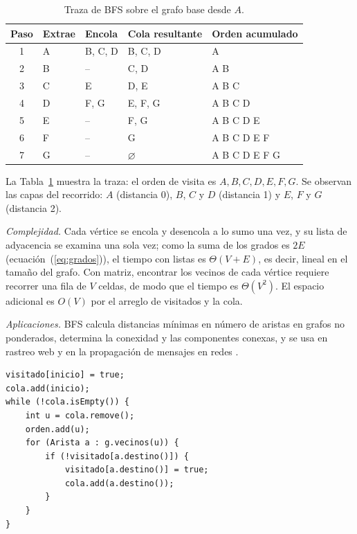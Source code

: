 \documentclass[conference]{IEEEtran}
\begin{document}
\begin{table}[t]
\caption{Traza de BFS sobre el grafo base desde $A$.}
\label{tab:bfs}
\centering
\footnotesize
\setlength{\tabcolsep}{4pt}
\begin{tabular}{@{}clllp{2.4cm}@{}}
\toprule
Paso & Extrae & Encola & Cola resultante & Orden acumulado \\
\midrule
1 & A & B, C, D & B, C, D & A \\
2 & B & -- & C, D & A B \\
3 & C & E & D, E & A B C \\
4 & D & F, G & E, F, G & A B C D \\
5 & E & -- & F, G & A B C D E \\
6 & F & -- & G & A B C D E F \\
7 & G & -- & $\varnothing$ & A B C D E F G \\
\bottomrule
\end{tabular}
\end{table}

La Tabla~\ref{tab:bfs} muestra la traza: el orden de visita es $A,B,C,D,E,F,G$. Se observan las capas del recorrido: $A$ (distancia 0), $B$, $C$ y $D$ (distancia 1) y $E$, $F$ y $G$ (distancia 2).

\emph{Complejidad.} Cada vértice se encola y desencola a lo sumo una vez, y su lista de adyacencia se examina una sola vez; como la suma de los grados es $2E$ (ecuación~(\ref{eq:grados})), el tiempo con listas es $\Theta(V+E)$, es decir, lineal en el tamaño del grafo. Con matriz, encontrar los vecinos de cada vértice requiere recorrer una fila de $V$ celdas, de modo que el tiempo es $\Theta(V^2)$. El espacio adicional es $O(V)$ por el arreglo de visitados y la cola.

\emph{Aplicaciones.} BFS calcula distancias mínimas en número de aristas en grafos no ponderados, determina la conexidad y las componentes conexas, y se usa en rastreo web y en la propagación de mensajes en redes \cite{clrs,sedgewick}.

\noindent\begin{minipage}{\columnwidth}
\begin{lstlisting}[caption={Núcleo de BFS (\texttt{BFS.java}).},label={lst:bfs}]
visitado[inicio] = true;
cola.add(inicio);
while (!cola.isEmpty()) {
    int u = cola.remove();
    orden.add(u);
    for (Arista a : g.vecinos(u)) {
        if (!visitado[a.destino()]) {
            visitado[a.destino()] = true;
            cola.add(a.destino());
        }
    }
}
\end{lstlisting}
\end{minipage}\par\medskip
\end{document}
